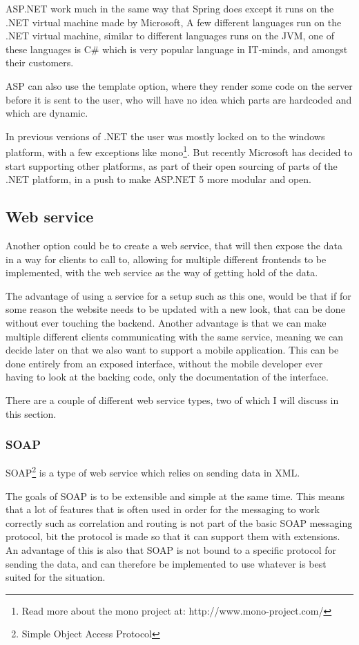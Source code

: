ASP.NET work much in the same way that Spring does except it runs on the .NET virtual machine made by Microsoft, A few different languages run on the .NET virtual machine, similar to different languages runs on the JVM, one of these languages is C\# which is very popular language in IT-minds, and amongst their customers.

ASP can also use the template option, where they render some code on the server before it is sent to the user, who will have no idea which parts are hardcoded and which are dynamic.

In previous versions of .NET the user was mostly locked on to the windows platform, with a few exceptions like mono\footnote{Read more about the mono project at: http://www.mono-project.com/}. But recently Microsoft has decided to start supporting other platforms, as part of their open sourcing of parts of the .NET platform\cite{.net-core}, in a push to make ASP.NET 5 more modular and open.

\subsection{Web service}
\label{sub:Web service}
Another option could be to create a web service, that will then expose the data in a way for clients to call to, allowing for multiple different frontends to be implemented, with the web service as the way of getting hold of the data.

The advantage of using a service for a setup such as this one, would be that if for some reason the website needs to be updated with a new look, that can be done without ever touching the backend. Another advantage is that we can make multiple different clients communicating with the same service, meaning we can decide later on that we also want to support a mobile application. This can be done entirely from an exposed interface, without the mobile developer ever having to look at the backing code, only the documentation of the interface.

There are a couple of different web service types, two of which I will discuss in this section.

\subsubsection{SOAP}
\label{subs:SOAP}
SOAP\footnote{Simple Object Access Protocol} is a type of web service which relies on sending data in XML.

The goals of SOAP is to be extensible and simple at the same time\cite{soap:messaging}. This means that a lot of features that is often used in order for the messaging to work correctly such as correlation and routing is not part of the basic SOAP messaging protocol, bit the protocol is made so that it can support them with extensions. An advantage of this is also that SOAP is not bound to a specific protocol for sending the data, and can therefore be implemented to use whatever is best suited for the situation.

